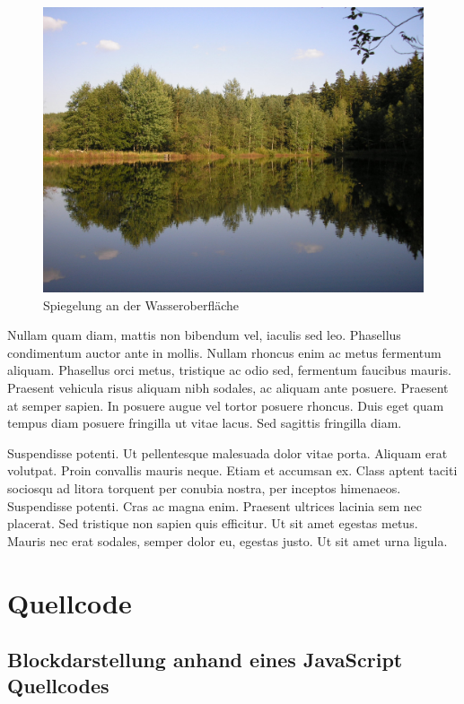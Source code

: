\begin{figure}
	\includegraphics[width=\linewidth]{content/to-be-removed/Kleiner_Streichteich_Ilmenau.JPG}
	\caption{Spiegelung an der Wasseroberfläche \cite{TestCitation022}}
\end{figure}

Nullam quam diam, mattis non bibendum vel, iaculis sed leo. Phasellus condimentum auctor ante in mollis. Nullam rhoncus enim ac metus fermentum aliquam. Phasellus orci metus, tristique ac odio sed, fermentum faucibus mauris. Praesent vehicula risus aliquam nibh sodales, ac aliquam ante posuere. Praesent at semper sapien. In posuere augue vel tortor posuere rhoncus. Duis eget quam tempus diam posuere fringilla ut vitae lacus. Sed sagittis fringilla diam.

Suspendisse potenti. Ut pellentesque malesuada dolor vitae porta. Aliquam erat volutpat. Proin convallis mauris neque. Etiam et accumsan ex. Class aptent taciti sociosqu ad litora torquent per conubia nostra, per inceptos himenaeos. Suspendisse potenti. Cras ac magna enim. Praesent ultrices lacinia sem nec placerat. Sed tristique non sapien quis efficitur. Ut sit amet egestas metus. Mauris nec erat sodales, semper dolor eu, egestas justo. Ut sit amet urna ligula.

\section{Quellcode}

\subsection{Blockdarstellung anhand eines JavaScript Quellcodes}


